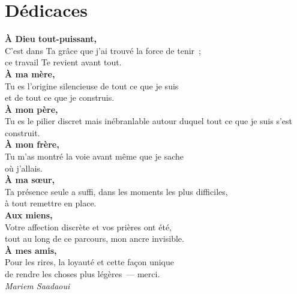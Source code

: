 \documentclass[12pt,a4paper,oneside]{report}
\begin{document}

\clearpage
\null\thispagestyle{empty}\clearpage

\setcounter{page}{1}
\chapter*{Dédicaces}

\vspace*{2cm}
\begin{center}
\textbf{À Dieu tout-puissant,}\\[0.4em]
C'est dans Ta grâce que j'ai trouvé la force de tenir~;\\
ce travail Te revient avant tout.\\[1.2em]

\textbf{À ma mère,}\\[0.4em]
Tu es l'origine silencieuse de tout ce que je suis\\
et de tout ce que je construis.\\[1.2em]

\textbf{À mon père,}\\[0.4em]
Tu es le pilier discret mais inébranlable autour duquel tout ce que je suis s'est construit.\\[1.2em]

\textbf{À mon frère,}\\[0.4em]
Tu m'as montré la voie avant même que je sache\\
où j'allais.\\[1.2em]

\textbf{À ma sœur,}\\[0.4em]
Ta présence seule a suffi, dans les moments les plus difficiles,\\
à tout remettre en place.\\[1.2em]

\textbf{Aux miens,}\\[0.4em]
Votre affection discrète et vos prières ont été,\\
tout au long de ce parcours, mon ancre invisible.\\[1.2em]

\textbf{À mes amis,}\\[0.4em]
Pour les rires, la loyauté et cette façon unique\\
de rendre les choses plus légères~— merci.\\[2em]

\textit{Mariem Saadaoui}

\end{center}
\end{document}
